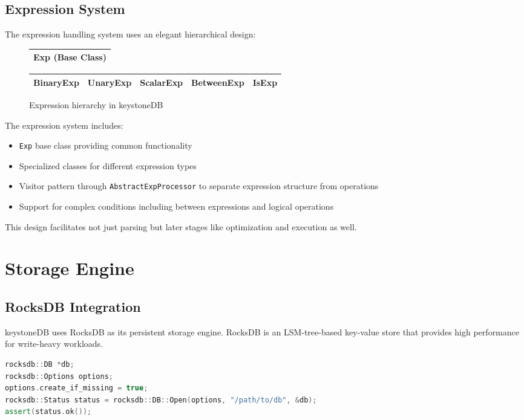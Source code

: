 \documentclass[12pt,a4paper]{article}
\begin{document}
\subsection{Expression System}
The expression handling system uses an elegant hierarchical design:

\begin{figure}[H]
\centering
\begin{tabular}{|c|}
\hline
\textbf{Exp (Base Class)} \\
\hline
\end{tabular}
\newline
\newline
\begin{tabular}{|c|c|c|c|c|}
\hline
BinaryExp & UnaryExp & ScalarExp & BetweenExp & IsExp \\
\hline
\end{tabular}
\caption{Expression hierarchy in keystoneDB}
\end{figure}

The expression system includes:
\begin{itemize}
    \item \texttt{Exp} base class providing common functionality
    \item Specialized classes for different expression types
    \item Visitor pattern through \texttt{AbstractExpProcessor} to separate expression structure from operations
    \item Support for complex conditions including between expressions and logical operations
\end{itemize}

This design facilitates not just parsing but later stages like optimization and execution as well.

\section{Storage Engine}
\subsection{RocksDB Integration}
keystoneDB uses RocksDB as its persistent storage engine. RocksDB is an LSM-tree-based key-value store that provides high performance for write-heavy workloads.

\begin{lstlisting}[language=C++,caption=Opening a RocksDB database]
rocksdb::DB *db;
rocksdb::Options options;
options.create_if_missing = true;
rocksdb::Status status = rocksdb::DB::Open(options, "/path/to/db", &db);
assert(status.ok());
\end{lstlisting}
\end{document}
